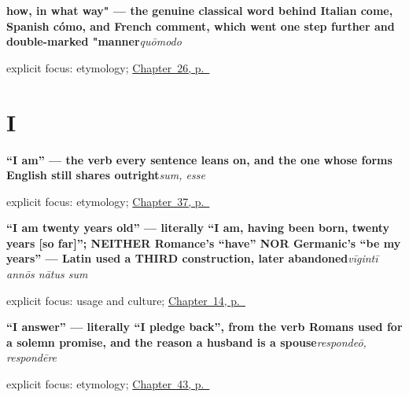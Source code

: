 \noindent\begin{minipage}[t]{\linewidth}
\raggedright
\textbf{how, in what way" — the genuine classical word behind Italian come, Spanish cómo, and French comment, which went one step further and double-marked "manner}\enspace\emph{quōmodo}\par
\footnotesize explicit focus: etymology; \hyperref[ch:la-how]{Chapter~26, p.~\pageref*{ch:la-how}}
\end{minipage}\par\smallskip

\section*{I}

\noindent\begin{minipage}[t]{\linewidth}
\raggedright
\textbf{\textquotedblleft{}I am\textquotedblright{} — the verb every sentence leans on, and the one whose forms English still shares outright}\enspace\emph{sum, esse}\par
\footnotesize explicit focus: etymology; \hyperref[ch:la-core-verbs]{Chapter~37, p.~\pageref*{ch:la-core-verbs}}
\end{minipage}\par\smallskip

\noindent\begin{minipage}[t]{\linewidth}
\raggedright
\textbf{\textquotedblleft{}I am twenty years old\textquotedblright{} — literally \textquotedblleft{}I am, having been born, twenty years {[}so far{]}\textquotedblright{}; NEITHER Romance's \textquotedblleft{}have\textquotedblright{} NOR Germanic's \textquotedblleft{}be my years\textquotedblright{} — Latin used a THIRD construction, later abandoned}\enspace\emph{vīgintī annōs nātus sum}\par
\footnotesize explicit focus: usage and culture; \hyperref[ch:la-asking-age]{Chapter~14, p.~\pageref*{ch:la-asking-age}}
\end{minipage}\par\smallskip

\noindent\begin{minipage}[t]{\linewidth}
\raggedright
\textbf{\textquotedblleft{}I answer\textquotedblright{} — literally \textquotedblleft{}I pledge back\textquotedblright{}, from the verb Romans used for a solemn promise, and the reason a husband is a spouse}\enspace\emph{respondeō, respondēre}\par
\footnotesize explicit focus: etymology; \hyperref[ch:la-answering-meeting-buying]{Chapter~43, p.~\pageref*{ch:la-answering-meeting-buying}}
\end{minipage}\par\smallskip

